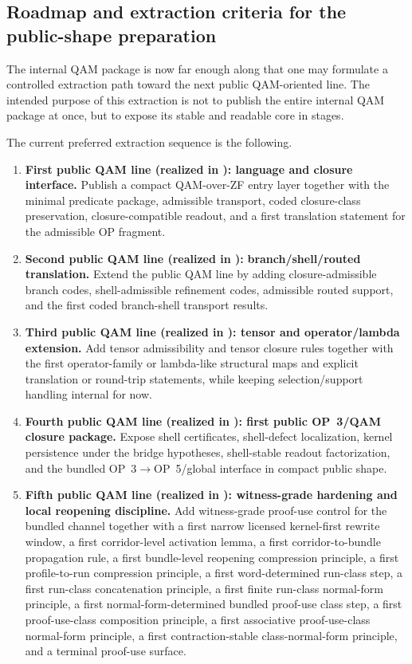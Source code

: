 \subsection*{Roadmap and extraction criteria for the  public-shape preparation}
The internal QAM package is now far enough along that one may formulate a controlled extraction path toward the next public QAM-oriented line. The intended purpose of this extraction is not to publish the entire internal QAM package at once, but to expose its stable and readable core in stages.

The current preferred extraction sequence is the following.
\begin{enumerate}[leftmargin=2em]
 \item \textbf{First public QAM line (realized in ): language and closure interface.} Publish a compact QAM-over-ZF entry layer together with the minimal predicate package, admissible transport, coded closure-class preservation, closure-compatible readout, and a first translation statement for the admissible OP fragment.
 \item \textbf{Second public QAM line (realized in ):} \textbf{branch/shell/routed translation.} Extend the public QAM line by adding closure-admissible branch codes, shell-admissible refinement codes, admissible routed support, and the first coded branch-shell transport results.
 \item \textbf{Third public QAM line (realized in ): tensor and operator/lambda extension.} Add tensor admissibility and tensor closure rules together with the first operator-family or lambda-like structural maps and explicit translation or round-trip statements, while keeping selection/support handling internal for now.
 \item \textbf{Fourth public QAM line (realized in ): first public OP~3/QAM closure package.} Expose shell certificates, shell-defect localization, kernel persistence under the bridge hypotheses, shell-stable readout factorization, and the bundled OP~3$\to$OP~5/global interface in compact public shape.
 \item \textbf{Fifth public QAM line (realized in ): witness-grade hardening and local reopening discipline.} Add witness-grade proof-use control for the bundled channel together with a first narrow licensed kernel-first rewrite window, a first corridor-level activation lemma, a first corridor-to-bundle propagation rule, a first bundle-level reopening compression principle, a first profile-to-run compression principle, a first word-determined run-class step, a first run-class concatenation principle, a first finite run-class normal-form principle, a first normal-form-determined bundled proof-use class step, a first proof-use-class composition principle, a first associative proof-use-class normal-form principle, a first contraction-stable class-normal-form principle, and a terminal proof-use surface.

\end{enumerate}
